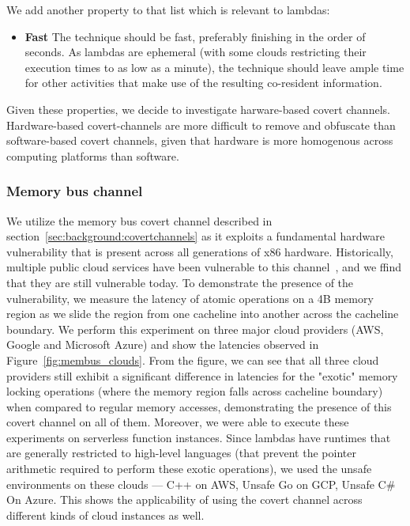 \noindent We add another property to that list which is relevant to lambdas:
\begin{itemize}
    \item \textbf{Fast} The technique should be fast, preferably finishing in 
    the order of seconds. As lambdas are ephemeral (with some clouds restricting their 
    execution times to as low as a minute), the technique should leave ample time 
    for other activities that make use of the resulting co-resident information.
\end{itemize}

Given these properties, we decide to investigate harware-based covert channels.
Hardware-based covert-channels are more difficult to remove and obfuscate than
software-based covert channels, given that hardware is more homogenous across
computing platforms than software. 

\subsubsection{Memory bus channel}
We utilize the memory bus covert channel described in
section~\ref{sec:background:covertchannels} as it exploits a fundamental
hardware vulnerability that is present across all generations of x86 hardware.
Historically, multiple public cloud services have been vulnerable to this
channel~\cite{varad191016,zhang2016}, and we ffind that they are still
vulnerable today. To demonstrate the presence of the vulnerability, we measure
the latency of atomic operations on a 4B memory region as we slide the region
from one cacheline into another across the cacheline boundary. We perform this
experiment on three major cloud providers (AWS, Google and Microsoft Azure) and
show the latencies observed in Figure~\ref{fig:membus_clouds}. From the figure,
we can see that all three cloud providers still exhibit a significant difference
in latencies for the "exotic" memory locking operations (where the memory region
falls across cacheline boundary) when compared to regular memory accesses,
demonstrating the presence of this covert channel on all of them. Moreover, we
were able to execute these experiments on serverless function instances. Since
lambdas have runtimes that are generally restricted to high-level languages
(that prevent the pointer arithmetic required to perform these exotic
operations), we used the unsafe environments on these clouds --- C++ on AWS,
Unsafe Go on GCP, Unsafe C\# On Azure. This shows the applicability of using the
covert channel across different kinds of cloud instances as well.


